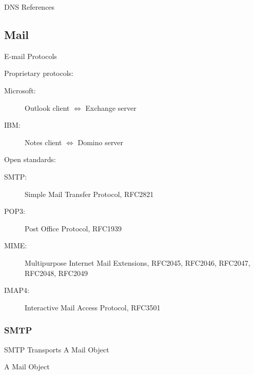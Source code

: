 \begin{frame}{DNS References}
  \begin{refsection}
    \nocite{wiki:dns, rfc1034, rfc1035}
    \printbibliography[heading=none]
  \end{refsection}
\end{frame}

\subsection{Mail}

\begin{frame}{E-mail Protocols}
  \begin{block}{Proprietary protocols:}
    \begin{description}
    \item[Microsoft:] Outlook client $\Longleftrightarrow$ Exchange server
    \item[IBM:] Notes client $\Longleftrightarrow$ Domino server
    \end{description}
  \end{block}
  \begin{block}{Open standards:}
    \begin{description}
    \item[SMTP:] Simple Mail Transfer Protocol, RFC2821
    \item[POP3:] Post Office Protocol, RFC1939
    \item[MIME:] Multipurpose Internet Mail Extensions, RFC2045, RFC2046, RFC2047,
      RFC2048, RFC2049
    \item[IMAP4:] Interactive Mail Access Protocol, RFC3501
    \end{description}
  \end{block}
\end{frame}
  
\subsubsection{SMTP}

\begin{frame}{SMTP Transports A Mail Object}
  \begin{block}{A Mail Object}
    \begin{center}
    \end{center} \label{fig:mail_obj}
  \end{block}  
\end{frame}

